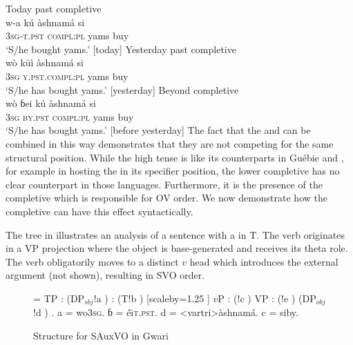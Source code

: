 \documentclass[output=paper,newtxmath,modfonts,nonflat,draftmode]{langsci/langscibook}
\begin{document}
\ea \label{ex:14:gwari}
\ea \label{ex:14a:gwari} {Today past completive}	\\
\gll w-a kú àshnamá si  \\
3\textsc{sg}-\textsc{t.pst} \textsc{compl:pl} yams buy \\
\glt `S/he bought yams.' [today] \hfill \citep[][57]{hyman1970}
\ex \label{ex:14b:gwari} {Yesterday past completive}	\\
\gll wò  k\=uì àshnamá si  \\
3\textsc{sg} \textsc{y.pst}.\textsc{compl:pl} yams buy \\
\glt `S/he has bought yams.' [yesterday] \hfill \citep[][57]{hyman1970}
\ex \label{ex:14c:gwari}{Beyond  completive}	\\
\gll wò {ɓei} kú àshnamá si  \\
3\textsc{sg} \textsc{by.pst} \textsc{compl:pl} yams buy \\
\glt `S/he has bought yams.' [before yesterday] \hfill \citep[][57]{hyman1970}
\z
\z
The fact that the  and  can be combined in this way demonstrates that they are not competing for the same structural position. While the high tense  is like its  counterparts in Guébie and , for example in hosting the  in its specifier position, the lower completive  has no clear counterpart in those languages. Furthermore, it is the presence of the completive which is responsible for OV order. We now demonstrate how the completive can have this effect syntactically.

The tree in  illustrates an analysis of a  sentence with a   in T. The verb originates in a VP projection where the object is base-generated and receives its theta role. The verb obligatorily moves to a distinct $v$ head which introduces the external argument (not shown), resulting in SVO order.

\begin{figure}
{\scriptsize \jtree[xunit=2.5em,yunit=1.25em]
\! = {TP}
: ({DP$_{sbj}$}!a ) 
: ({T}!b ) [scaleby=1.25 ] {$v$P}
: ({}!c ) {VP}
: ({}!e ) ({DP$_{obj}$}!d ) .
\!a = {wo}{\textsc{3sg}}.
ɓ = {{\texthtb{}é\=\i}}{\textsc{t.pst}}.
\!d = <vartri>{àshnamá}{}.
\!c = {si}{by}.
\endjtree}	

\caption{Structure for SAuxVO in Gwari}
\label{fig:sande:GwariVO}
\end{figure}
\end{document}
